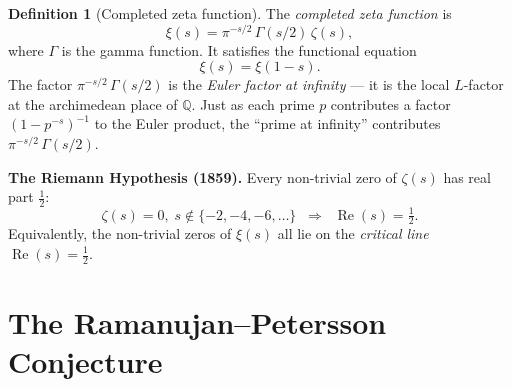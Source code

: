 \documentclass[11pt,a4paper]{article}
\theoremstyle{plain}
\theoremstyle{definition}
\newtheorem{definition}[theorem]{Definition}
\newcommand{\Q}{\mathbb{Q}}
\begin{document}
\begin{tcolorbox}[breakable, colback=green!8, colframe=green!8,
  boxrule=0pt, sharp corners]
\begin{definition}[Completed zeta function]
\label{def:xi}
The \emph{completed zeta function} is
\begin{equation}
\label{eq:xi}
  \xi(s) = \pi^{-s/2}\, \Gamma(s/2)\, \zeta(s),
\end{equation}
where $\Gamma$ is the gamma function. It satisfies the functional
equation
\begin{equation}
\label{eq:func-eq}
  \xi(s) = \xi(1 - s).
\end{equation}
The factor $\pi^{-s/2}\, \Gamma(s/2)$ is the \emph{Euler factor at
infinity} --- it is the local $L$-factor at the archimedean place of
$\Q$. Just as each prime $p$ contributes a factor
$(1 - p^{-s})^{-1}$ to the Euler product, the ``prime at infinity''
contributes $\pi^{-s/2}\, \Gamma(s/2)$.
\end{definition}
\end{tcolorbox}

\begin{tcolorbox}[colback=blue!8, colframe=blue!8,
  boxrule=0pt, sharp corners]
\textbf{The Riemann Hypothesis (1859).}
Every non-trivial zero of $\zeta(s)$ has real part $\frac{1}{2}$:
\[
  \zeta(s) = 0,\; s \notin \{-2, -4, -6, \ldots\}
  \;\;\Longrightarrow\;\;
  \operatorname{Re}(s) = \tfrac{1}{2}.
\]
Equivalently, the non-trivial zeros of $\xi(s)$ all lie on the
\emph{critical line} $\operatorname{Re}(s) = \frac{1}{2}$.
\end{tcolorbox}


\section{The Ramanujan--Petersson Conjecture}
\label{sec:ramanujan-petersson}
\end{document}
